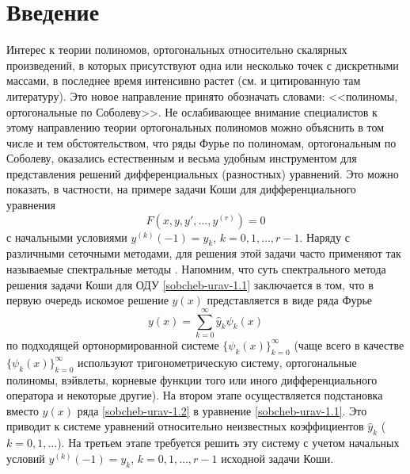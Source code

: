 \section{Введение}
Интерес к теории полиномов, ортогональных относительно скалярных произведений, в которых присутствуют одна или несколько точек  с дискретными массами,  в последнее время интенсивно растет  (см. \cite{sobcheb_urav-KwonLittl1,sobcheb_urav- KwonLittl2,sobcheb_urav-MarcelAlfaroRezola,sobcheb_urav-IserKoch,sobcheb_urav-Meijer,sobcheb_urav-Lopez1995,
sobcheb_urav-MarcelXu,sobcheb_urav-Shar2016}  и цитированную там литературу).
 Это новое направление принято обозначать словами: <<полиномы, ортогональные по Соболеву>>. Не ослабивающее внимание специалистов  к этому направлению теории ортогональных полиномов можно объяснить в том числе и тем обстоятельством, что ряды Фурье по полиномам, ортогональным по Соболеву, оказались естественным и весьма удобным инструментом для представления решений  дифференциальных (разностных) уравнений. Это можно показать, в частности, на примере  задачи Коши для  дифференциального уравнения
\begin{equation}\label{sobcheb-urav-1.1}
F(x,y,y',\ldots,y^{(r)})=0
 \end{equation}
с начальными условиями $y^{(k)}(-1)=y_k$, $k=0,1,\ldots,r-1$.  Наряду с различными сеточными методами, для решения этой задачи часто применяют так называемые спектральные методы
\cite{sobcheb_urav-Tref1,sobcheb_urav-Tref2,sobcheb_urav-SolDmEg,sobcheb_urav-Pash,sobcheb_urav-Arush2010,
sobcheb_urav-Arush2013,sobcheb_urav-Arush2014,sobcheb_urav-Lukom2016}. Напомним, что суть спектрального метода решения задачи Коши  для ОДУ \eqref{sobcheb-urav-1.1} заключается в том, что в первую очередь искомое решение $y(x)$ представляется в виде ряда Фурье
\begin{equation}\label{sobcheb-urav-1.2}
 y(x)=\sum_{k=0}^\infty \hat y_k\psi_k(x)
 \end{equation}
по подходящей ортонормированной системе $\{\psi_k(x)\}_{k=0}^\infty$ (чаще всего в качестве $\{\psi_k(x)\}_{k=0}^\infty$ используют    тригонометрическую систему, ортогональные полиномы, вэйвлеты, корневые функции того или иного дифференциального оператора  и некоторые другие). На втором этапе осуществляется подстановка вместо $y(x)$ ряда \eqref{sobcheb-urav-1.2} в уравнение \eqref{sobcheb-urav-1.1}. Это приводит к системе уравнений относительно неизвестных коэффициентов $\hat y_k$ ($k=0,1,\ldots$). На третьем этапе требуется решить эту систему с учетом начальных условий  $y^{(k)}(-1)=y_k$, $k=0,1,\ldots,r-1$ исходной задачи Коши.
